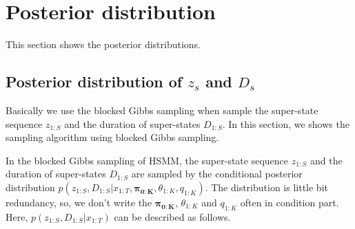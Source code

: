 \documentclass[a4paper]{article}
\begin{document}
\section{Posterior distribution}
This section shows the posterior distributions.

\subsection{Posterior distribution of $z_s$ and $D_s$}
Basically we use the blocked Gibbs sampling when sample the super-state sequence $z_{1:S}$ and the duration of super-states $D_{1:S}$.
In this section, we shows the sampling algorithm using blocked Gibbs sampling.
\par
In the blocked Gibbs sampling of HSMM, the super-state sequence $z_{1:S}$ and the duration of super-states $D_{1:S}$ are sampled by the conditional posterior distribution $p(z_{1:S} , D_{1:S}| x_{1:T}, \boldsymbol{\pi_{0:K}}, \theta_{1:K}, q_{1:K})$.
The distribution is little bit redundancy, so, we don't write the $\boldsymbol{\pi_{0:K}}$, $\theta_{1:K}$ and $q_{1:K}$ often in condition part.
Here, $p(z_{1:S} , D_{1:S}| x_{1:T})$ can be described as follows.
\end{document}
